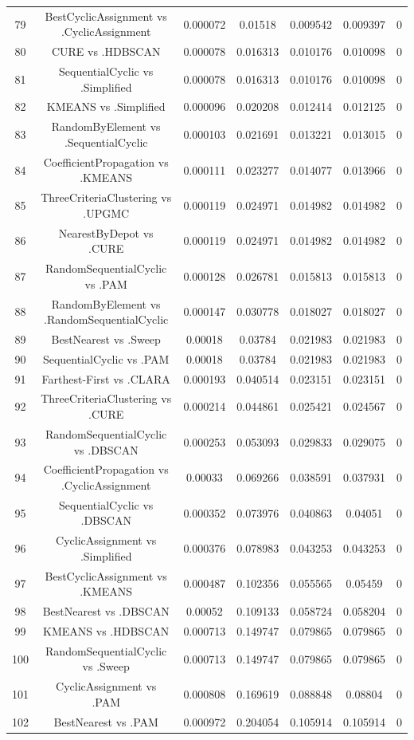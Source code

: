 \documentclass[a4paper,10pt]{article}
\begin{document}
\begin{landscape}
\begin{table}[!htp]
\begin{tabular}{ccccccc}
79&BestCyclicAssignment vs .CyclicAssignment&0.000072&0.01518&0.009542&0.009397&0\\
80&CURE vs .HDBSCAN&0.000078&0.016313&0.010176&0.010098&0\\
81&SequentialCyclic vs .Simplified&0.000078&0.016313&0.010176&0.010098&0\\
82&KMEANS vs .Simplified&0.000096&0.020208&0.012414&0.012125&0\\
83&RandomByElement vs .SequentialCyclic&0.000103&0.021691&0.013221&0.013015&0\\
84&CoefficientPropagation vs .KMEANS&0.000111&0.023277&0.014077&0.013966&0\\
85&ThreeCriteriaClustering vs .UPGMC&0.000119&0.024971&0.014982&0.014982&0\\
86&NearestByDepot vs .CURE&0.000119&0.024971&0.014982&0.014982&0\\
87&RandomSequentialCyclic vs .PAM&0.000128&0.026781&0.015813&0.015813&0\\
88&RandomByElement vs .RandomSequentialCyclic&0.000147&0.030778&0.018027&0.018027&0\\
89&BestNearest vs .Sweep&0.00018&0.03784&0.021983&0.021983&0\\
90&SequentialCyclic vs .PAM&0.00018&0.03784&0.021983&0.021983&0\\
91&Farthest-First vs .CLARA&0.000193&0.040514&0.023151&0.023151&0\\
92&ThreeCriteriaClustering vs .CURE&0.000214&0.044861&0.025421&0.024567&0\\
93&RandomSequentialCyclic vs .DBSCAN&0.000253&0.053093&0.029833&0.029075&0\\
94&CoefficientPropagation vs .CyclicAssignment&0.00033&0.069266&0.038591&0.037931&0\\
95&SequentialCyclic vs .DBSCAN&0.000352&0.073976&0.040863&0.04051&0\\
96&CyclicAssignment vs .Simplified&0.000376&0.078983&0.043253&0.043253&0\\
97&BestCyclicAssignment vs .KMEANS&0.000487&0.102356&0.055565&0.05459&0\\
98&BestNearest vs .DBSCAN&0.00052&0.109133&0.058724&0.058204&0\\
99&KMEANS vs .HDBSCAN&0.000713&0.149747&0.079865&0.079865&0\\
100&RandomSequentialCyclic vs .Sweep&0.000713&0.149747&0.079865&0.079865&0\\
101&CyclicAssignment vs .PAM&0.000808&0.169619&0.088848&0.08804&0\\
102&BestNearest vs .PAM&0.000972&0.204054&0.105914&0.105914&0\\

\end{tabular}
\end{table}
\end{landscape}
\end{document}
